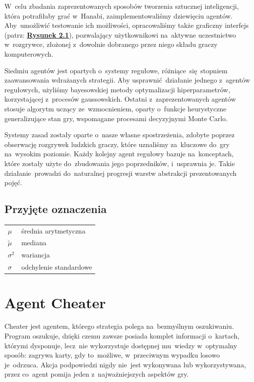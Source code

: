 \documentclass[declaration,shortabstract,inz]{iithesis}
\begin{document}
W~celu zbadania zaprezentowanych sposobów tworzenia sztucznej inteligencji, która potrafiłaby grać w~Hanabi, zaimplementowaliśmy dziewięciu agentów. Aby~umożliwić testowanie ich możliwości, opracowaliśmy także graficzny interfejs (patrz: \hyperref[fig:gui]{\textbf{Rysunek 2.1}}), pozwalający użytkownikowi na~aktywne uczestnictwo w~rozgrywce, złożonej z~dowolnie dobranego przez niego składu graczy komputerowych.

Siedmiu agentów jest opartych o~systemy regułowe, różniące~się stopniem zaawansowania wdrażanych strategii. Aby usprawnić działanie jednego z~agentów regułowych, użyliśmy bayesowskiej metody optymalizacji hiperparametrów, korzystającej z~procesów gaussowskich. Ostatni z~zaprezentowanych agentów stosuje algorytm uczący ze~wzmocnieniem, oparty o~funkcje heurystyczne generalizujące stan gry, wspomagane procesami decyzyjnymi Monte Carlo.

Systemy zasad zostały oparte o~nasze własne spostrzeżenia, zdobyte poprzez obserwację rozgrywek ludzkich graczy, które uznaliśmy za~kluczowe do~gry na~wysokim poziomie. Każdy kolejny agent regułowy bazuje na~konceptach, które zostały użyte do~zbudowania jego poprzedników, i~usprawnia je. Takie działanie~prowadzi do~naturalnej progresji warstw abstrakcji prezentowanych pojęć.

\subsection*{Przyjęte oznaczenia}

\begin{tabular}{@{}>{$}l<{$}@{ --- }l@{}}
	\mu & średnia arytmetyczna \\
	\tilde{\mu} & mediana \\
	\sigma^2 & wariancja \\
	\sigma & odchylenie standardowe \\
\end{tabular}

\newpage

\section{Agent Cheater}

Cheater jest agentem, którego strategia polega na~bezmyślnym oszukiwaniu. Program oszukuje, dzięki czemu zawsze posiada komplet informacji o~kartach, którymi dysponuje, lecz~nie wykorzystuje dostępnej mu~wiedzy w~optymalny sposób: zagrywa karty, gdy to~możliwe, w~przeciwnym wypadku losowo je~odrzuca. Akcja podpowiedzi nigdy nie~jest wykonywana lub wykorzystywana, przez co~agent pomija jeden z~najważniejszych aspektów gry.
\end{document}
